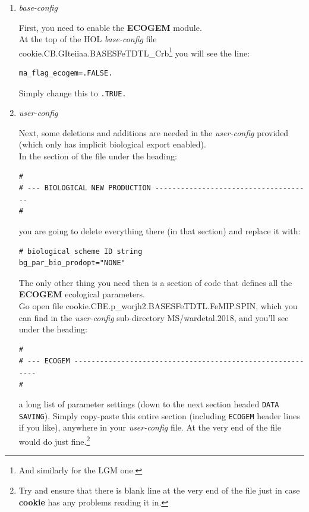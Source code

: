 \begin{enumerate}[noitemsep]

\vspace{1mm}
\item \textit{base-config}

\vspace{1mm}
First, you need to enable the \textbf{ECOGEM} module.
\vspace{1mm}
\\At the top of the HOL \textit{base-config} file \textsf{\footnotesize cookie.CB.GIteiiaa.BASESFeTDTL\_Crb}\footnote{And similarly for the LGM one.} you will see the line:
\vspace{-2mm}\small\begin{verbatim}
ma_flag_ecogem=.FALSE.
\end{verbatim}\normalsize\vspace{-2mm}
Simply change this to \texttt{.TRUE.}
\vspace{6mm}
\pagebreak

\vspace{1mm}
\item \textit{user-config}

\vspace{1mm}
Next, some deletions and additions are needed in the \textit{user-config} provided (which only has implicit biological export enabled).
\vspace{1mm}
\\In the section of the file under the heading:
\footnotesize\begin{verbatim}
#
# --- BIOLOGICAL NEW PRODUCTION -------------------------------------
#
\end{verbatim}\normalsize
you are going to delete everything there (in that section) and replace it with:
\vspace{-1mm}\small\begin{verbatim}
# biological scheme ID string
bg_par_bio_prodopt="NONE"
\end{verbatim}\normalsize\vspace{-1mm}
The only other thing you need then is a section of code that defines all the \textbf{ECOGEM} ecological parameters.
\vspace{1mm}
\\ Go open file \textsf{\footnotesize cookie.CBE.p\_worjh2.BASESFeTDTL.FeMIP.SPIN}, which you can find in the \textit{user-config} sub-directory \textsf{\footnotesize MS/wardetal.2018}, and you'll see under the heading:
\footnotesize\begin{verbatim}
#
# --- ECOGEM ----------------------------------------------------------
#
\end{verbatim}\normalsize
a long list of parameter settings (down to the next section headed \texttt{DATA SAVING}). Simply copy-paste this entire section (including \texttt{ECOGEM} header lines if you like), anywhere in your \textit{user-config} file. At the very end of the file would do just fine.\footnote{Try and ensure that there is blank line at the very end of the file just in case \textbf{cookie} has any problems reading it in.}


\end{enumerate}

